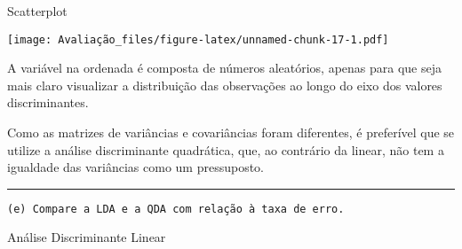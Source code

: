 \documentclass[]{article}
\newenvironment{Shaded}{\begin{snugshade}}{\end{snugshade}}
\newcommand{\KeywordTok}[1]{\textcolor[rgb]{0.13,0.29,0.53}{\textbf{#1}}}
\newcommand{\DataTypeTok}[1]{\textcolor[rgb]{0.13,0.29,0.53}{#1}}
\newcommand{\DecValTok}[1]{\textcolor[rgb]{0.00,0.00,0.81}{#1}}
\newcommand{\StringTok}[1]{\textcolor[rgb]{0.31,0.60,0.02}{#1}}
\newcommand{\OperatorTok}[1]{\textcolor[rgb]{0.81,0.36,0.00}{\textbf{#1}}}
\newcommand{\NormalTok}[1]{#1}
\begin{document}
Scatterplot

\begin{Shaded}
\end{Shaded}

\texttt{[image: Avaliação\_files/figure-latex/unnamed-chunk-17-1.pdf]}

A variável na ordenada é composta de números aleatórios, apenas para que
seja mais claro visualizar a distribuição das observações ao longo do
eixo dos valores discriminantes.

Como as matrizes de variâncias e covariâncias foram diferentes, é
preferível que se utilize a análise discriminante quadrática, que, ao
contrário da linear, não tem a igualdade das variâncias como um
pressuposto.

\begin{center}\rule{0.5\linewidth}{\linethickness}\end{center}

\begin{verbatim}
(e) Compare a LDA e a QDA com relação à taxa de erro. 
\end{verbatim}

Análise Discriminante Linear
\end{document}
